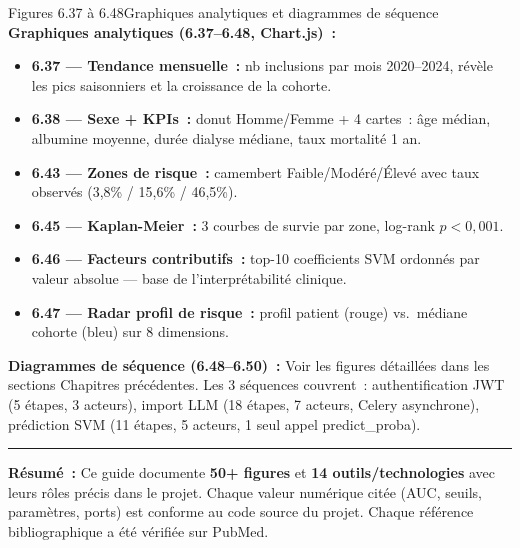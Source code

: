 \documentclass[12pt,a4paper]{article}
\begin{document}
\begin{figbox}{Figures 6.37 à 6.48}{Graphiques analytiques et diagrammes de séquence}
\textbf{Graphiques analytiques (6.37--6.48, Chart.js)~:}
\begin{itemize}[leftmargin=1.5em, itemsep=1pt]
  \item \textbf{6.37 --- Tendance mensuelle~:} nb inclusions par mois 2020--2024,
    révèle les pics saisonniers et la croissance de la cohorte.
  \item \textbf{6.38 --- Sexe + KPIs~:} donut Homme/Femme + 4 cartes~:
    âge médian, albumine moyenne, durée dialyse médiane, taux mortalité 1 an.
  \item \textbf{6.43 --- Zones de risque~:} camembert Faible/Modéré/Élevé
    avec taux observés (3{,}8\% / 15{,}6\% / 46{,}5\%).
  \item \textbf{6.45 --- Kaplan-Meier~:} 3 courbes de survie par zone,
    log-rank $p<0{,}001$.
  \item \textbf{6.46 --- Facteurs contributifs~:} top-10 coefficients SVM
    ordonnés par valeur absolue --- base de l'interprétabilité clinique.
  \item \textbf{6.47 --- Radar profil de risque~:} profil patient (rouge) vs.\
    médiane cohorte (bleu) sur 8 dimensions.
\end{itemize}

\textbf{Diagrammes de séquence (6.48--6.50)~:}
Voir les figures détaillées dans les sections Chapitres précédentes.
Les 3 séquences couvrent~: authentification JWT (5 étapes, 3 acteurs),
import LLM (18 étapes, 7 acteurs, Celery asynchrone), prédiction SVM
(11 étapes, 5 acteurs, 1 seul appel predict\_proba).
\end{figbox}

\bigskip\noindent\rule{\linewidth}{0.4pt}\bigskip

\noindent\textbf{Résumé~:} Ce guide documente \textbf{50+ figures} et
\textbf{14 outils/technologies} avec leurs rôles précis dans le projet.
Chaque valeur numérique citée (AUC, seuils, paramètres, ports) est conforme
au code source du projet. Chaque référence bibliographique a été vérifiée
sur PubMed.
\end{document}
